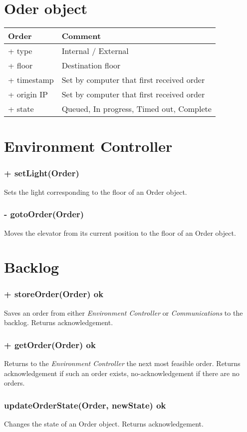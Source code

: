 \documentclass[11pt,a4paper]{article}
\begin{document}
\section*{Oder object}
\begin{tabu}{|X|X|}
\hline
\textbf{Order} & Comment\\ \hline
+ type & Internal / External\\
+ floor & Destination floor\\
+ timestamp & Set by computer that first received order\\
+ origin IP & Set by computer that first received order\\
+ state & Queued, In progress, Timed out, Complete\\ \hline
\end{tabu}
\section*{Environment Controller}
\subsubsection*{+ setLight(Order)}
Sets the light corresponding to the floor of an Order object.
\subsubsection*{- gotoOrder(Order)}
Moves the elevator from its current position to the floor of an Order object.
\section*{Backlog}
\subsubsection*{+ storeOrder(Order) ok}
Saves an order from either \textit{Environment Controller} or \textit{Communications} to the backlog. Returns acknowledgement.
\subsubsection*{+ getOrder(Order) ok}
Returns to the \textit{Environment Controller} the next most feasible order. Returns acknowledgement if such an order exists, no-acknowledgement if there are no orders.
\subsubsection*{updateOrderState(Order, newState) ok}
Changes the state of an Order object. Returns acknowledgement.
\end{document}
